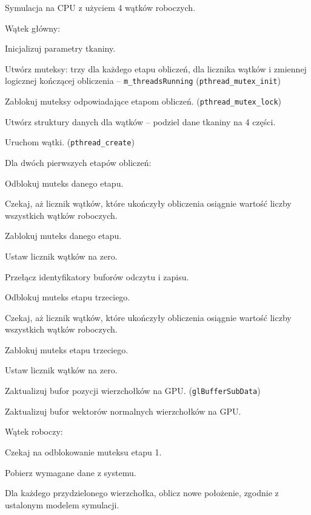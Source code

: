 		\begin{algorithm}
			\label{alg_5_3}
			\caption{Symulacja na CPU z użyciem 4 wątków roboczych.}	
			Wątek główny:
			
			\Indp
			
			Inicjalizuj parametry tkaniny.
			
			Utwórz muteksy: trzy dla każdego etapu obliczeń, dla licznika wątków i zmiennej logicznej kończącej obliczenia -- \texttt{m\_threadsRunning} (\texttt{pthread\_mutex\_init})
			
			Zablokuj muteksy odpowiadające etapom obliczeń. (\texttt{pthread\_mutex\_lock})
			
			Utwórz struktury danych dla wątków -- podziel dane tkaniny na 4 części.
			
			Uruchom wątki. (\texttt{pthread\_create})
			
			{
				Dla dwóch pierwszych etapów obliczeń:
				
				\Indp
					Odblokuj muteks danego etapu.
					
					Czekaj, aż licznik wątków, które ukończyły obliczenia osiągnie wartość liczby wszystkich wątków roboczych.
					
					Zablokuj muteks danego etapu.
					
					Ustaw licznik wątków na zero.
					
					Przełącz identyfikatory buforów odczytu i zapisu.
				\Indm
				
				Odblokuj muteks etapu trzeciego.
				
				Czekaj, aż licznik wątków, które ukończyły obliczenia osiągnie wartość liczby wszystkich wątków roboczych.
				
				Zablokuj muteks etapu trzeciego.
				
				Ustaw licznik wątków na zero.
				
				Zaktualizuj bufor pozycji wierzchołków na GPU. (\texttt{glBufferSubData})
				
				Zaktualizuj bufor wektorów normalnych wierzchołków na GPU.
			}
			
			\Indm
			
			Wątek roboczy:
			
			{
				Czekaj na odblokowanie muteksu etapu 1.
				
				Pobierz wymagane dane z systemu.
				
				Dla każdego przydzielonego wierzchołka, oblicz nowe położenie, zgodnie z ustalonym modelem symulacji.
				
}
\end{algorithm}
